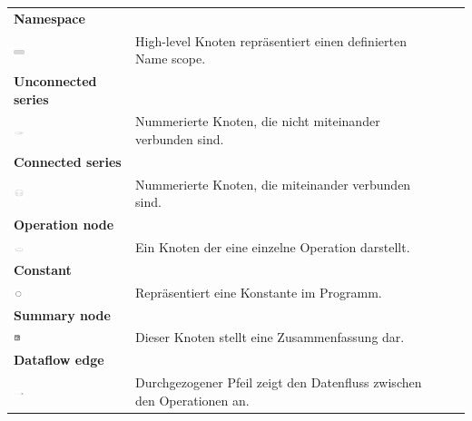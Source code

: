 \begin{tabular}{ p{4cm}p{10.8cm} ll }

\textbf{Namespace} \tabularnewline 
\includegraphics[width=0.1\textwidth]{images/Kapitel_3/namespace.png}
\label{fig:namespace}
 & High-level Knoten repräsentiert einen definierten Name scope.   \tabularnewline
  
\textbf{Unconnected series} \tabularnewline 
\includegraphics[width=0.1\textwidth]{images/Kapitel_3/Unconnected_series.png}
\label{fig:Unconnected_series}
 & Nummerierte Knoten, die nicht miteinander verbunden sind. \tabularnewline
  
\textbf{Connected series} \tabularnewline 
\includegraphics[width=0.1\textwidth]{images/Kapitel_3/Connected_series.png}
\label{fig:Connected_series}
 & Nummerierte Knoten, die miteinander verbunden sind. \tabularnewline 
 
\textbf{Operation node} \tabularnewline 
\includegraphics[width=0.1\textwidth]{images/Kapitel_3/Operation_node.png}
\label{fig:Operation_node}
 & Ein Knoten der eine einzelne Operation darstellt.  \tabularnewline 
 
\textbf{Constant} \tabularnewline 
\includegraphics[width=0.08\textwidth]{images/Kapitel_3/Constant.png}
\label{fig:Constant}
 & Repräsentiert eine Konstante im Programm.  \tabularnewline 

\textbf{Summary node} \tabularnewline 
\includegraphics[width=0.07\textwidth]{images/Kapitel_3/Summary_node.png}
\label{fig:Summary_node}
 & Dieser Knoten stellt eine Zusammenfassung dar.  \tabularnewline 

\textbf{Dataflow edge} \tabularnewline 
\includegraphics[width=0.1\textwidth]{images/Kapitel_3/Dataflow_edge.png}
\label{fig:Dataflow_edge}
 & Durchgezogener Pfeil zeigt den Datenfluss zwischen den Operationen an.  \tabularnewline
 

\end{tabular}
